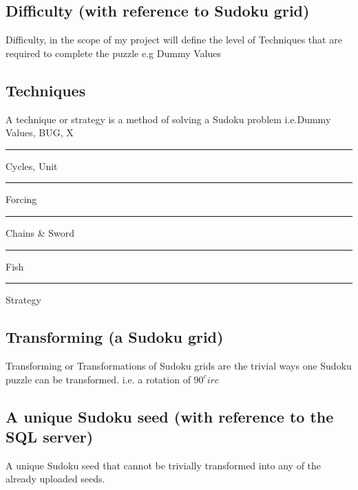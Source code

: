 \documentclass[fleqn]{article}
\newcommand{\TextUnderscore}{\rule{.4em}{.4pt}}
\begin{document}
\subsection*{Difficulty (with reference to Sudoku grid)}
Difficulty, in the scope of my project will define the level of Techniques that are required to complete the puzzle e.g Dummy Values
\subsection*{Techniques}
A technique or strategy is a method of solving a Sudoku problem i.e.Dummy Values, BUG, X\TextUnderscore Cycles, Unit\TextUnderscore Forcing\TextUnderscore Chains \& Sword\TextUnderscore Fish\TextUnderscore Strategy
\subsection*{Transforming (a Sudoku grid)}
Transforming or Transformations of Sudoku grids are the trivial ways one Sudoku puzzle can be transformed. i.e. a rotation of $90^circ$
\subsection*{A unique Sudoku seed (with reference to the SQL server)}
A unique Sudoku seed that cannot be trivially transformed into any of the already uploaded seeds.
\end{document}
